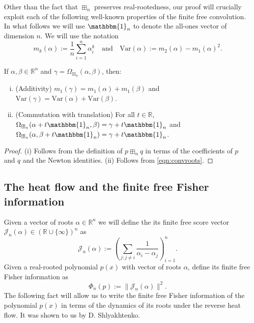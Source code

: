 \documentclass[12pt]{amsart}
\newcommand{\bR}{\mathbb{R}}
\newcommand{\var}{\mathrm{Var}}
\newcommand{\bone}{\mathbbm{1}}
\newcommand{\roots}{\Omega_{\boxplus_n}}
\newcommand{\score}{\mathscr{J}_n}
\begin{document}
Other than the fact that $\boxplus_n$ preserves real-rootedness, our proof will crucially exploit each of the following well-known properties of the finite free convolution. In what follows we will use $\bone_n$ to denote the all-ones vector of dimension $n$. 
We will use the notation $$m_k(\alpha):= \frac{1}{n}\sum_{i=1}^n \alpha_i^k \quad \text{and} \quad \var(\alpha) := m_2(\alpha)-m_1(\alpha)^2.$$


\begin{proposition}
\label{thm:ffconvolution}
    If $\alpha, \beta\in \bR^n$ and  $\gamma =\roots( \alpha, \beta)$, then:
    \begin{enumerate}[i)]
        \item \label{item:additivity} (Additivity) $m_1(\gamma)=m_1(\alpha)+m_1(\beta)$ and $\var(\gamma) = \var(\alpha)+\var(\beta)$. 
        \item \label{item:translations} (Commutation with translation)   For all $t\in \bR$, $\roots(\alpha+t\bone_n ,\beta) = \gamma +t\bone_n$ and  $\roots(\alpha , \beta + t \bone_n) = \gamma+t\bone_n$.  
    \end{enumerate}
\end{proposition}
\begin{proof}
	(i) Follows from the definition of $p\boxplus_n q$ in terms of the coefficients of $p$ and $q$ and the Newton identities. (ii) Follows from \eqref{eqn:convroots}. 
\end{proof}

 

\subsection{The heat flow and the finite free Fisher information} 
Given a vector of roots $\alpha\in \bR^n$ we will define the its finite free score vector $\score(\alpha) \in (\bR\cup\{\infty\})^n$ as 
$$\score(\alpha) := \left( \sum_{j : j \neq i} \frac{1}{\alpha_i-\alpha_j} \right)_{i=1}^n. $$
Given a real-rooted polynomial $p(x)$ with vector of roots $\alpha$, define its finite free Fisher information as 
$$\Phi_n(p) := \|\score(\alpha)\|^2.$$
The following fact will allow us to write the finite free Fisher information of the polynomial $p(x)$ in terms of the dynamics of its roots under the reverse heat flow. It was shown to us by D. Shlyakhtenko.
\end{document}
